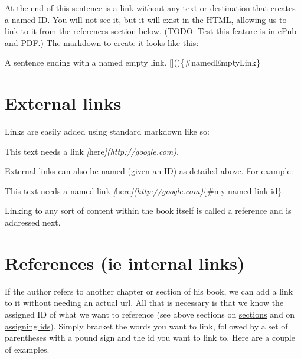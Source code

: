\documentclass[
]{book}
\newenvironment{Shaded}{\begin{snugshade}}{\end{snugshade}}
\newcommand{\CommentTok}[1]{\textcolor[rgb]{0.56,0.35,0.01}{\textit{#1}}}
\newcommand{\NormalTok}[1]{#1}
\newcommand{\OtherTok}[1]{\textcolor[rgb]{0.56,0.35,0.01}{#1}}
\begin{document}
At the end of this sentence is a link without any text or destination that creates a named ID. \protect\hypertarget{namedEmptyLink}{\href{}{}} You will not see it, but it will exist in the HTML, allowing us to link to it from the \protect\hyperlink{references}{references section} below. (TODO: Test this feature is in ePub and PDF.) The markdown to create it looks like this:

\begin{Shaded}
\begin{Highlighting}[]
\NormalTok{A sentence ending with a named empty link. []()\{\#namedEmptyLink\}}
\end{Highlighting}
\end{Shaded}

\hypertarget{external-links}{%
\section{External links}\label{external-links}}

Links are easily added using standard markdown like so:

\begin{Shaded}
\begin{Highlighting}[]
\NormalTok{This text needs a link }\CommentTok{[}\OtherTok{here}\CommentTok{](http://google.com)}\NormalTok{.}
\end{Highlighting}
\end{Shaded}

External links can also be named (given an ID) as detailed \protect\hyperlink{assigning-ids}{above}. For example:

\begin{Shaded}
\begin{Highlighting}[]
\NormalTok{This text needs a named link }\CommentTok{[}\OtherTok{here}\CommentTok{](http://google.com)}\NormalTok{\{\#my{-}named{-}link{-}id\}.}
\end{Highlighting}
\end{Shaded}

Linking to any sort of content within the book itself is called a reference and is addressed next.

\hypertarget{references}{%
\section{References (ie internal links)}\label{references}}

If the author refers to another chapter or section of his book, we can add a link to it without needing an actual url. All that is necessary is that we know the assigned ID of what we want to reference (see above sections on \protect\hyperlink{chapters-sections-and-more}{sections} and on \protect\hyperlink{assigning-ids}{assigning ids}). Simply bracket the words you want to link, followed by a set of parentheses with a pound sign and the id you want to link to. Here are a couple of examples.
\end{document}
